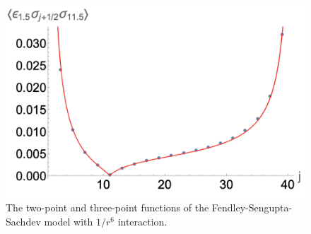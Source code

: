 \documentclass[prb,twocolumn,11pt]{revtex4-1}
\begin{document}
\begin{figure}[htbp]
\includegraphics[scale=0.35]{ess_long_range2.png}
\caption{The two-point and three-point functions of the Fendley-Sengupta-Sachdev model with $1/r^6$ interaction.}
\label{correlationsHBlong}
\end{figure}

%

\end{document}

